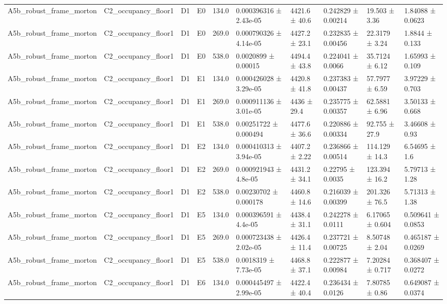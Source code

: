 \begin{table}
\begin{tabular}{llllllllll}
A5b\_robust\_frame\_morton & C2\_occupancy\_floor1 & D1 & E0 & 134.0 & 0.000396316 ± 2.43e-05 & 4421.6 ± 40.6 & 0.242829 ± 0.00214 & 19.503 ± 3.36 & 1.84088 ± 0.0623 \\
A5b\_robust\_frame\_morton & C2\_occupancy\_floor1 & D1 & E0 & 269.0 & 0.000790326 ± 4.14e-05 & 4427.2 ± 23.1 & 0.232835 ± 0.00456 & 22.3179 ± 3.24 & 1.8844 ± 0.133 \\
A5b\_robust\_frame\_morton & C2\_occupancy\_floor1 & D1 & E0 & 538.0 & 0.0020899 ± 0.00015 & 4494.4 ± 43.8 & 0.224041 ± 0.0066 & 35.7124 ± 6.12 & 1.65993 ± 0.109 \\
A5b\_robust\_frame\_morton & C2\_occupancy\_floor1 & D1 & E1 & 134.0 & 0.000426028 ± 3.29e-05 & 4420.8 ± 41.8 & 0.237383 ± 0.00437 & 57.7977 ± 6.59 & 3.97229 ± 0.703 \\
A5b\_robust\_frame\_morton & C2\_occupancy\_floor1 & D1 & E1 & 269.0 & 0.000911136 ± 3.01e-05 & 4436 ± 29.4 & 0.235775 ± 0.00357 & 62.5881 ± 6.96 & 3.50133 ± 0.668 \\
A5b\_robust\_frame\_morton & C2\_occupancy\_floor1 & D1 & E1 & 538.0 & 0.00251722 ± 0.000494 & 4477.6 ± 36.6 & 0.220886 ± 0.00334 & 92.755 ± 27.9 & 3.46608 ± 0.93 \\
A5b\_robust\_frame\_morton & C2\_occupancy\_floor1 & D1 & E2 & 134.0 & 0.000410313 ± 3.94e-05 & 4407.2 ± 2.22 & 0.236866 ± 0.00514 & 114.129 ± 14.3 & 6.54695 ± 1.6 \\
A5b\_robust\_frame\_morton & C2\_occupancy\_floor1 & D1 & E2 & 269.0 & 0.000921943 ± 4.8e-05 & 4431.2 ± 34.1 & 0.22795 ± 0.0035 & 123.394 ± 16.2 & 5.79713 ± 1.28 \\
A5b\_robust\_frame\_morton & C2\_occupancy\_floor1 & D1 & E2 & 538.0 & 0.00230702 ± 0.000178 & 4460.8 ± 14.6 & 0.216039 ± 0.00399 & 201.326 ± 76.5 & 5.71313 ± 1.38 \\
A5b\_robust\_frame\_morton & C2\_occupancy\_floor1 & D1 & E5 & 134.0 & 0.000396591 ± 4.4e-05 & 4438.4 ± 31.1 & 0.242278 ± 0.0111 & 6.17065 ± 0.604 & 0.509641 ± 0.0853 \\
A5b\_robust\_frame\_morton & C2\_occupancy\_floor1 & D1 & E5 & 269.0 & 0.000723438 ± 2.02e-05 & 4426.4 ± 11.4 & 0.237721 ± 0.00725 & 8.50748 ± 2.04 & 0.465187 ± 0.0269 \\
A5b\_robust\_frame\_morton & C2\_occupancy\_floor1 & D1 & E5 & 538.0 & 0.0018319 ± 7.73e-05 & 4468.8 ± 37.1 & 0.222877 ± 0.00984 & 7.20284 ± 0.717 & 0.368407 ± 0.0272 \\
A5b\_robust\_frame\_morton & C2\_occupancy\_floor1 & D1 & E6 & 134.0 & 0.000445497 ± 2.99e-05 & 4422.4 ± 40.4 & 0.236434 ± 0.0126 & 7.80785 ± 0.86 & 0.649087 ± 0.0374 \\

\end{tabular}
\end{table}
